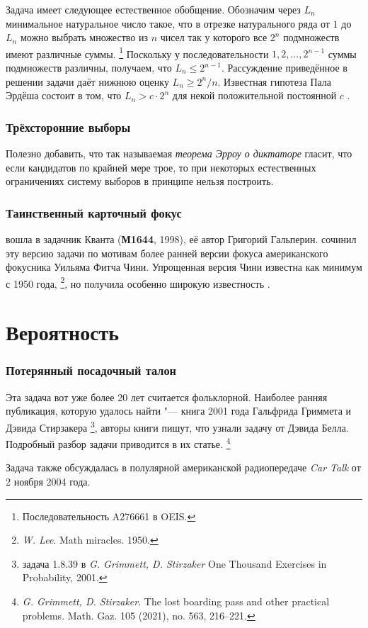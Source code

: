 \documentclass[twoside]{book}
\begin{document}
Задача имеет следующее естественное обобщение.
Обозначим через $L_n$ минимальное натуральное число такое,
что в отрезке натурального ряда от $1$ до $L_n$ можно выбрать множество из $n$ чисел так у которого все $2^n$ подмножеств имеют различные суммы.%
\footnote{Последовательность A276661 в OEIS.}
Поскольку у последовательности $1,2,\dots, 2^{n-1}$ суммы подмножеств различны, получаем, что $L_n\le 2^{n-1}$.
Рассуждение приведённое в решении задачи даёт нижнюю оценку $L_n\ge 2^n/n$.
Известная гипотеза Пала Эрдёша состоит в том, что $L_n>c\cdot 2^n$ для некой положительной постоянной $c$ \cite[C8]{guy}.

\subsubsection{Трёхсторонние выборы}
Полезно добавить, что так называемая
\textit{теорема Эрроу о диктаторе} гласит, что если кандидатов по крайней мере трое, то при некоторых естественных ограничениях систему выборов в принципе нельзя построить.

\subsubsection{Таинственный карточный фокус}
 вошла в задачник Кванта (\textbf{М1644}, 1998), её автор Григорий Гальперин.  сочинил эту версию задачи по мотивам более ранней версии фокуса американского фокусника Уильяма Фитча Чини.
Упрощенная версия  Чини известна как минимум с 1950 года,
%
\footnote{\emph{W. Lee}. Math miracles. 1950.},
но получила особенно широкую известность  . 

\section{Вероятность}

\subsubsection{Потерянный посадочный талон}
Эта задача вот уже более 20 лет считается фольклорной.
Наиболее ранняя публикация, которую удалось найти "--- книга 2001 года Гальфрида Гриммета и Дэвида Стирзакера%
\footnote{задача 1.8.39 в \emph{G. Grimmett, D. Stirzaker} One Thousand Exercises in Probability, 2001.},
авторы книги пишут, что узнали задачу от Дэвида Белла.
Подробный разбор задачи приводится в их статье.%
\footnote{\emph{G. Grimmett, D. Stirzaker}.
The lost boarding pass and other practical problems.
Math. Gaz. 105 (2021), no. 563, 216--221.}

Задача также обсуждалась в полулярной американской радиопередаче \emph{Car Talk} от 2 ноября 2004 года.

{
\small

\printindex

}

{

\sloppy

\printbibliography[title={Дополнительная литература},heading=bibintoc]


\fussy

}

\newpage

{

\tableofcontents

}
\end{document}
